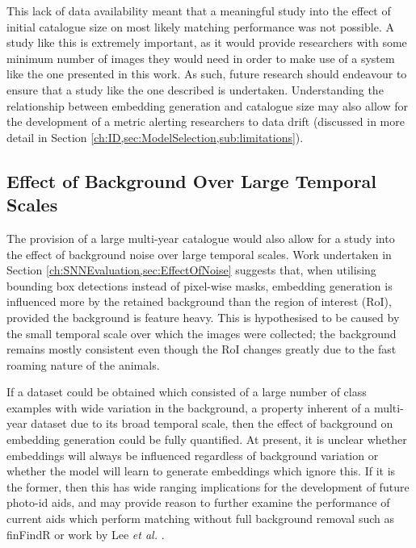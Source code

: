 This lack of data availability meant that a meaningful study into the effect of initial catalogue size on most likely matching performance was not possible. A study like this is extremely important, as it would provide researchers with some minimum number of images they would need in order to make use of a system like the one presented in this work. As such, future research should endeavour to ensure that a study like the one described is undertaken. Understanding the relationship between embedding generation and catalogue size may also allow for the development of a metric alerting researchers to data drift (discussed in more detail in Section \ref{ch:ID,sec:ModelSelection,sub:limitations}).

\subsection{Effect of Background Over Large Temporal Scales}\label{ch:Conclusion,sec:FutureWork,sub:EffectOfBackgroundOnLargeTemporalScales}

The provision of a large multi-year catalogue would also allow for a study into the effect of background noise over large temporal scales. Work undertaken in Section \ref{ch:SNNEvaluation,sec:EffectOfNoise} suggests that, when utilising bounding box detections instead of pixel-wise masks, embedding generation is influenced more by the retained background than the region of interest (RoI), provided the background is feature heavy. This is hypothesised to be caused by the small temporal scale over which the images were collected; the background remains mostly consistent even though the RoI changes greatly due to the fast roaming nature of the animals. 

If a dataset could be obtained which consisted of a large number of class examples with wide variation in the background, a property inherent of a multi-year dataset due to its broad temporal scale, then the effect of background on embedding generation could be fully quantified. At present, it is unclear whether embeddings will always be influenced regardless of background variation or whether the model will learn to generate embeddings which ignore this. If it is the former, then this has wide ranging implications for the development of future photo-id aids, and may provide reason to further examine the performance of current aids which perform matching without full background removal such as finFindR \cite{thompson_finfindr_2022} or work by Lee \textit{et al.} \cite{lee_backbone_2020}. 

